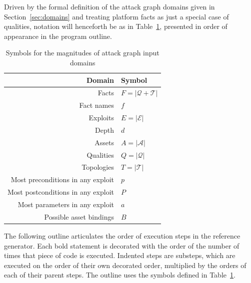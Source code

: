Driven by the formal definition of the attack graph domains given in 
Section~\ref{sec:domains} and treating platform facts as just a special case
of qualities, notation will henceforth be as in Table~\ref{table:onotation},
presented in order of appearance in the program outline.

\begin{table}
\centering
\begin{tabular}{r|l}
Domain & Symbol \\ \hline
Facts       & $F = |\mathcal{Q}+\mathcal{T}|$ \\
Fact names  & $f$ \\
Exploits    & $E = |\mathcal{E}|$ \\
Depth       & $d$ \\
Assets      & $A = |\mathcal{A}|$ \\
Qualities   & $Q = |\mathcal{Q}|$ \\
Topologies  & $T = |\mathcal{T}|$ \\
Most preconditions in any exploit & $p$ \\
Most postconditions in any exploit & $P$ \\
Most parameters in any exploit & $a$ \\
Possible asset bindings & $B$ \\
\end{tabular}
\caption{Symbols for the magnitudes of attack graph input domains}
\label{table:onotation}
\end{table}

The following outline articulates the order of execution steps in the reference
generator. Each bold statement is decorated with the order of the number of
times that piece of code is executed. Indented steps are substeps, which are
executed on the order of their own decorated order, multiplied by the orders of
each of their parent steps. The outline uses the symbols defined in 
Table~\ref{table:onotation}.

